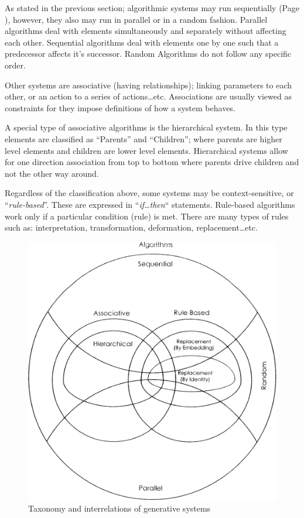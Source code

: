 As stated in the previous section; algorithmic systems may run sequentially (Page \pageref{SequentialAlgorithms}), however, they also may run in parallel or in a random fashion. Parallel algorithms deal with elements simultaneously and separately without affecting each other. Sequential algorithms deal with elements one by one such that a predecessor affects it's successor. Random Algorithms do not follow any specific order.

Other systems are associative (having relationships); linking parameters to each other, or an action to a series of actions\ldots etc. Associations are usually viewed as constraints for they impose definitions of how a system behaves. 

A special type of associative algorithms is the hierarchical system. In this type elements are classified as ``Parents'' and ``Children''; where parents are higher level elements and children are lower level elements. Hierarchical systems allow for one direction association from top to bottom where parents drive children and not the other way around.

Regardless of the classification above, some systems may be context-sensitive, or ``\emph{rule-based}''. These are expressed in ``\emph{if\ldots then}`` statements. Rule-based algorithms work only if a particular condition (rule) is met. There are many types of rules such as: interpretation, transformation, deformation, replacement\ldots etc.

\begin{figure}[htbp]
	\centering
	\includegraphics[width=\textwidth]{./Images/1-Taxonomy}
	\caption[Taxonomy of Generative Systems]{Taxonomy and interrelations of generative systems \cite{khaldi04}}
	\label{fig:Taxonomy}
\end{figure}

